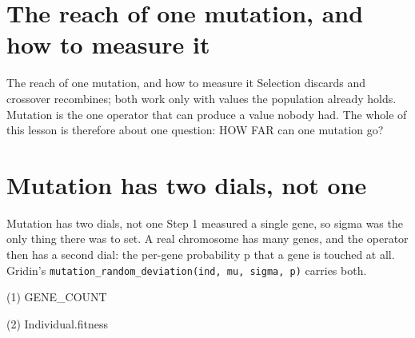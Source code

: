 \section{The reach of one mutation, and how to measure it}

\begin{frame}{The reach of one mutation, and how to measure it}
Selection discards and crossover recombines; both work only with values the
population already holds. Mutation is the one operator that can produce a value
nobody had. The whole of this lesson is therefore about one question: HOW FAR
can one mutation go?
\end{frame}


\section{Mutation has two dials, not one}

\begin{frame}{Mutation has two dials, not one}
Step 1 measured a single gene, so sigma was the only thing there was to set.
A real chromosome has many genes, and the operator then has a second dial: the
per-gene probability p that a gene is touched at all. Gridin's
\texttt{mutation\_random\_deviation(ind, mu, sigma, p)} carries both.
\end{frame}

\begin{frame}[fragile]{(1) GENE\_COUNT}

\end{frame}

\begin{frame}[fragile]{(2) Individual.fitness}

\end{frame}

